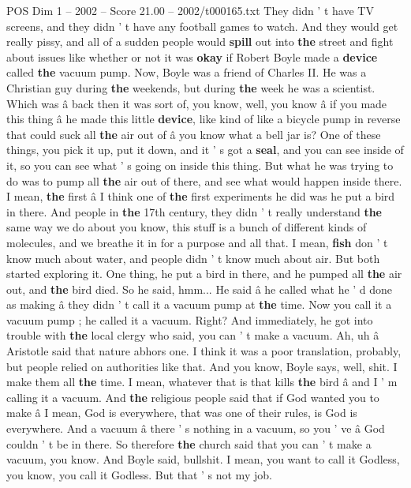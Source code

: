 \begin{textsample}{POS Dim 1 – 2002 – Score 21.00 – 2002/t000165.txt}
They didn ' t have TV screens, and they didn ' t have any football games to watch.
And they would get really pissy, and all of a sudden people would \textbf{spill} out into \textbf{the} street and fight about issues like whether or not it was \textbf{okay} if Robert Boyle made a \textbf{device} called \textbf{the} vacuum pump.
Now, Boyle was a friend of Charles II.
He was a Christian guy during \textbf{the} weekends, but during \textbf{the} week he was a scientist.
Which was â back then it was sort of, you know, well, you know â if you made this thing â he made this little \textbf{device}, like kind of like a bicycle pump in reverse that could suck all \textbf{the} air out of â you know what a bell jar is?
One of these things, you pick it up, put it down, and it ' s got a \textbf{seal}, and you can see inside of it, so you can see what ' s going on inside this thing.
But what he was trying to do was to pump all \textbf{the} air out of there, and see what would happen inside there.
I mean, \textbf{the} first â I think one of \textbf{the} first experiments he did was he put a bird in there.
And people in \textbf{the} 17th century, they didn ' t really understand \textbf{the} same way we do about you know, this stuff is a bunch of different kinds of molecules, and we breathe it in for a purpose and all that.
I mean, \textbf{fish} don ' t know much about water, and people didn ' t know much about air.
But both started exploring it.
One thing, he put a bird in there, and he pumped all \textbf{the} air out, and \textbf{the} bird died.
So he said, hmm...
He said â he called what he ' d done as making â they didn ' t call it a vacuum pump at \textbf{the} time.
Now you call it a vacuum pump ; he called it a vacuum.
Right?
And immediately, he got into trouble with \textbf{the} local clergy who said, you can ' t make a vacuum.
Ah, uh â Aristotle said that nature abhors one.
I think it was a poor translation, probably, but people relied on authorities like that.
And you know, Boyle says, well, shit.
I make them all \textbf{the} time.
I mean, whatever that is that kills \textbf{the} bird â and I ' m calling it a vacuum.
And \textbf{the} religious people said that if God wanted you to make â I mean, God is everywhere, that was one of their rules, is God is everywhere.
And a vacuum â there ' s nothing in a vacuum, so you ' ve â God couldn ' t be in there.
So therefore \textbf{the} church said that you can ' t make a vacuum, you know.
And Boyle said, bullshit.
I mean, you want to call it Godless, you know, you call it Godless.
But that ' s not my job.

\end{textsample}
